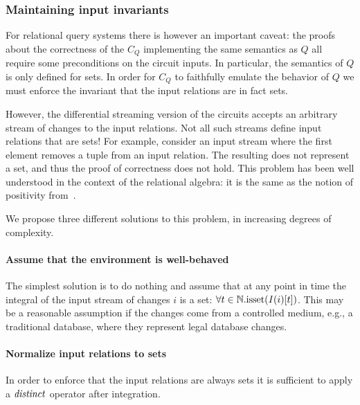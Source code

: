 \subsubsection{Maintaining input invariants}

For relational query systems there is however an important caveat: the
proofs about the correctness of the $C_Q$ implementing the same
semantics as $Q$ all require some preconditions on the circuit inputs.
In particular, the semantics of $Q$ is only defined for sets.  In
order for $C_Q$ to faithfully emulate the behavior of $Q$ we must
enforce the invariant that the input relations are in fact sets.

However, the differential streaming version of the circuits accepts an
arbitrary stream of changes to the input relations.  Not all such
streams define input relations that are sets!  For example, consider
an input stream where the first element removes a tuple from an input
relation.  The resulting \zr does not represent a set, and thus the
proof of correctness does not hold.  This problem has been well
understood in the context of the relational algebra: it is the same as
the notion of positivity from~\cite{green-tcs11}.

We propose three different solutions to this problem, in increasing
degrees of complexity.

\paragraph{Assume that the environment is well-behaved}

The simplest solution is to do nothing and assume that at any point in time
the integral of the input stream of changes $i$ is a set: $\forall t \in \mathbb{N} . \mbox{isset}(\mathit{I}(i)[t])$.
This may be a reasonable assumption if the changes come from a controlled
medium, e.g., a traditional database, where they represent legal database changes.

\paragraph{Normalize input relations to sets}

In order to enforce that the input relations are always sets it is sufficient
to apply a $\mathit{distinct}$ operator after integration.


